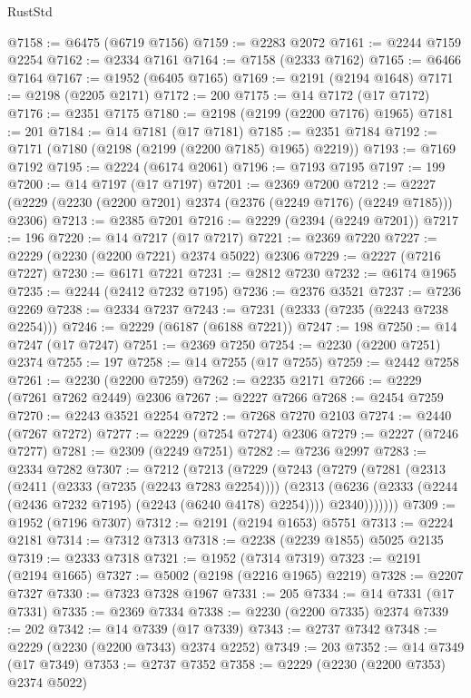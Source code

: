 \begin{lexlean}{RustStd}
\begin{coremodule}
@7158 := @6475 (@6719 @7156)
@7159 := @2283 @2072
@7161 := @2244 @7159 @2254
@7162 := @2334 @7161
@7164 := @7158 (@2333 @7162)
@7165 := @6466 @7164
@7167 := @1952 (@6405 @7165)
@7169 := @2191 (@2194 @1648)
@7171 := @2198 (@2205 @2171)
@7172 := 200
@7175 := @14 @7172 (@17 @7172)
@7176 := @2351 @7175
@7180 := @2198 (@2199 (@2200 @7176) @1965)
@7181 := 201
@7184 := @14 @7181 (@17 @7181)
@7185 := @2351 @7184
@7192 := @7171 (@7180 (@2198 (@2199 (@2200 @7185) @1965) @2219))
@7193 := @7169 @7192
@7195 := @2224 (@6174 @2061)
@7196 := @7193 @7195
@7197 := 199
@7200 := @14 @7197 (@17 @7197)
@7201 := @2369 @7200
@7212 := @2227 (@2229 (@2230 (@2200 @7201) @2374 (@2376 (@2249 @7176) (@2249 @7185))) @2306)
@7213 := @2385 @7201
@7216 := @2229 (@2394 (@2249 @7201))
@7217 := 196
@7220 := @14 @7217 (@17 @7217)
@7221 := @2369 @7220
@7227 := @2229 (@2230 (@2200 @7221) @2374 @5022) @2306
@7229 := @2227 (@7216 @7227)
@7230 := @6171 @7221
@7231 := @2812 @7230
@7232 := @6174 @1965
@7235 := @2244 (@2412 @7232 @7195)
@7236 := @2376 @3521
@7237 := @7236 @2269
@7238 := @2334 @7237
@7243 := @7231 (@2333 (@7235 (@2243 @7238 @2254)))
@7246 := @2229 (@6187 (@6188 @7221))
@7247 := 198
@7250 := @14 @7247 (@17 @7247)
@7251 := @2369 @7250
@7254 := @2230 (@2200 @7251) @2374
@7255 := 197
@7258 := @14 @7255 (@17 @7255)
@7259 := @2442 @7258
@7261 := @2230 (@2200 @7259)
@7262 := @2235 @2171
@7266 := @2229 (@7261 @7262 @2449) @2306
@7267 := @2227 @7266
@7268 := @2454 @7259
@7270 := @2243 @3521 @2254
@7272 := @7268 @7270 @2103
@7274 := @2440 (@7267 @7272)
@7277 := @2229 (@7254 @7274) @2306
@7279 := @2227 (@7246 @7277)
@7281 := @2309 (@2249 @7251)
@7282 := @7236 @2997
@7283 := @2334 @7282
@7307 := @7212
    (@7213
      (@7229
        (@7243
          (@7279
            (@7281
              (@2313
                (@2411 (@2333 (@7235 (@2243 @7283 @2254))))
                (@2313
                  (@6236 (@2333 (@2244 (@2436 @7232 @7195) (@2243 (@6240 @4178) @2254))))
                  @2340)))))))
@7309 := @1952 (@7196 @7307)
@7312 := @2191 (@2194 @1653) @5751
@7313 := @2224 @2181
@7314 := @7312 @7313
@7318 := @2238 (@2239 @1855) @5025 @2135
@7319 := @2333 @7318
@7321 := @1952 (@7314 @7319)
@7323 := @2191 (@2194 @1665)
@7327 := @5002 (@2198 (@2216 @1965) @2219)
@7328 := @2207 @7327
@7330 := @7323 @7328 @1967
@7331 := 205
@7334 := @14 @7331 (@17 @7331)
@7335 := @2369 @7334
@7338 := @2230 (@2200 @7335) @2374
@7339 := 202
@7342 := @14 @7339 (@17 @7339)
@7343 := @2737 @7342
@7348 := @2229 (@2230 (@2200 @7343) @2374 @2252)
@7349 := 203
@7352 := @14 @7349 (@17 @7349)
@7353 := @2737 @7352
@7358 := @2229 (@2230 (@2200 @7353) @2374 @5022)

\end{coremodule}
\end{lexlean}
